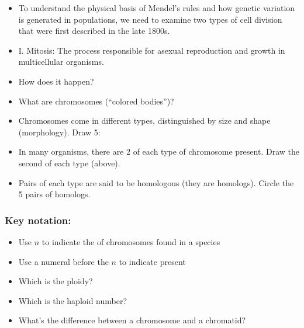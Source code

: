\begin{frame}
    \begin{itemize}
        \item To understand the physical basis of Mendel's rules and how
            genetic variation is generated in populations, we need to examine
            two types of cell division that were first described in the late
            1800s. 
        \item I. Mitosis: The process responsible for asexual reproduction and
            growth in multicellular organisms. 

        \item How does it happen? 
        \item What are chromosomes (``colored bodies'')?
    \end{itemize}
\end{frame}

\begin{frame}
    \begin{itemize}
        \item Chromosomes come in different types, distinguished by size and
            shape (morphology). Draw 5:
        \vspace{2.5cm}
        \item In many organisms, there are 2 of each type of chromosome
            present. Draw the second of each type (above).
        \item Pairs of each type are said to be homologous (they are homologs).
            Circle the 5 pairs of homologs.
    \end{itemize}

\end{frame}

\begin{frame}
    \frametitle{Key notation:}
    \begin{itemize}
        \item Use $n$ to indicate the  of
            chromosomes found in a species
        \item Use a numeral before the $n$ to indicate  present
        \item Which is the ploidy? 
        \item Which is the haploid number? 
        \item What's the difference between a chromosome and a chromatid?
    \end{itemize}
\end{frame}

